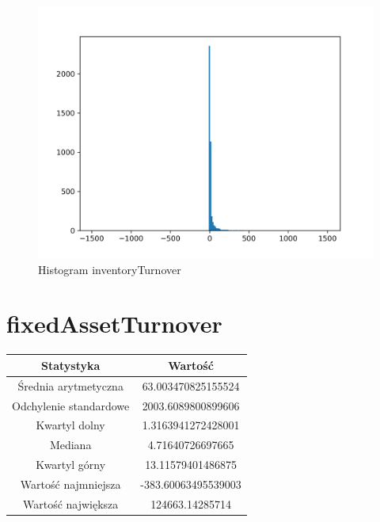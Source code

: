 \documentclass{article}
\begin{document}
\begin{figure}[h!]
    \includegraphics[width=\linewidth]{variables/inventoryTurnover.png}
    \caption{Histogram inventoryTurnover }
\end{figure}\section{ fixedAssetTurnover }

\begin{center}
    \begin{tabular}{|c | c|} 
    \hline
    Statystyka & Wartość \\
    \hline\hline
    Średnia arytmetyczna & 63.003470825155524 \\ 
    \hline
    Odchylenie standardowe & 2003.6089800899606 \\
    \hline
    Kwartyl dolny & 1.3163941272428001 \\
    \hline
    Mediana & 4.71640726697665 \\
    \hline
    Kwartyl górny & 13.11579401486875 \\
    \hline
    Wartość najmniejsza & -383.60063495539003 \\
    \hline
    Wartość największa & 124663.14285714 \\
    \hline
   \end{tabular}
\end{center}
\end{document}
